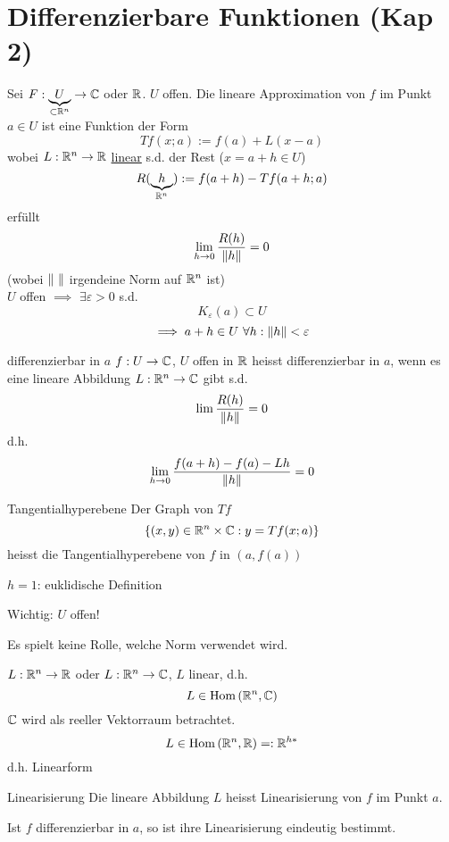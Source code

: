 \section{Differenzierbare Funktionen (Kap 2)}
\begin{Bem}
  Sei $F:\underbrace{U}_{\subset\mathbb{R}^n}\to\mathbb{C}$ oder $\mathbb{R}$. $U$ offen. Die lineare Approximation von $f$ im Punkt $a\in U$ ist eine Funktion der Form
  \[Tf(x;a):=f(a)+L(x-a)\]
  wobei $L:\mathbb{R}^n\to\mathbb{R}$ \underline{linear} s.d. der Rest ($x=a+h\in U$)
  \[R(\underbrace{h}_{\mathbb{R}^n}):=f(a+h)-Tf(a+h;a)\]
  erfüllt
  \[\displaystyle\lim_{h\rightarrow0}\frac{R(h)}{\left\| h \right\|}=0\]
  (wobei $\left\| \  \right\|$ irgendeine Norm auf $\mathbb{R}^n$ ist)\\
  $U$ offen $\implies$ $\exists \varepsilon>0$ s.d.
  \[K_\varepsilon(a)\subset U\]
  \[\implies a+h\in U\ \forall h:\left\| h \right\|<\varepsilon\]
\end{Bem}
\begin{Def}{differenzierbar in $a$}
  $f:U\to\mathbb{C}$, $U$ offen in $\mathbb{R}$ heisst differenzierbar in $a$, wenn es eine lineare Abbildung $L:\mathbb{R}^n\to\mathbb{C}$ gibt s.d.
  \[\lim\frac{R(h)}{\left\| h \right\|}=0\]
  d.h.
  \[\displaystyle\lim_{h\rightarrow0}\frac{f(a+h)-f(a)-Lh}{\left\| h \right\|}=0\]
\end{Def}
\begin{Def}{Tangentialhyperebene}
  Der Graph von $Tf$
  \[\left\{ \left( x,y \right)\in \mathbb{R}^n\times \mathbb{C}:y=Tf(x;a) \right\}\]
  heisst die Tangentialhyperebene von $f$ in $(a,f(a))$
\end{Def}
\begin{Bem}
  $h=1$: euklidische Definition
\end{Bem}
\begin{Bem}
  Wichtig: $U$ offen!
\end{Bem}
\begin{Bem}
  Es spielt keine Rolle, welche Norm verwendet wird.
\end{Bem}
\begin{Bem}
  $L:\mathbb{R}^n\to\mathbb{R}$ oder $L:\mathbb{R}^n\to\mathbb{C}$, $L$ linear, d.h.
  \[L\in\operatorname{Hom}\left( \mathbb{R}^n,\mathbb{C} \right)\]
  $\mathbb{C}$ wird als reeller Vektorraum betrachtet.
  \[L\in\operatorname{Hom}\left( \mathbb{R}^n,\mathbb{R} \right)=:\mathbb{R}^{h*}\]
  d.h. Linearform
\end{Bem}
\begin{Def}{Linearisierung}
  Die lineare Abbildung $L$ heisst Linearisierung von $f$ im Punkt $a$.
\end{Def}
\begin{Lem}
  Ist $f$ differenzierbar in $a$, so ist ihre Linearisierung eindeutig bestimmt.
\end{Lem}
